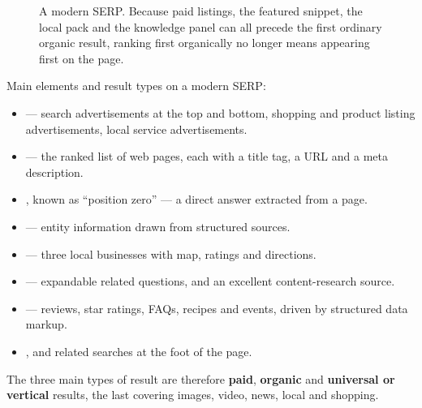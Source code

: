 \begin{figure}[htbp]
\caption[Anatomy of a modern search engine results page]%
        {A modern SERP. Because paid listings, the featured snippet, the local
         pack and the knowledge panel can all precede the first ordinary organic
         result, ranking first organically no longer means appearing first on the
         page.}
\label{fig:serp}
\end{figure}

\noindent Main elements and result types on a modern SERP:

\begin{itemize}
\item {} --- search advertisements at the top and bottom,
      shopping and product listing advertisements, local service advertisements.
\item {} --- the ranked list of web pages, each with a title
      tag, a URL and a meta description.
\item {}, known as ``position zero'' --- a direct answer
      extracted from a page.
\item {} --- entity information drawn
      from structured sources.
\item {} --- three local businesses with map, ratings
      and directions.
\item {} --- expandable related questions, and an excellent
      content-research source.
\item {} --- reviews, star ratings, FAQs, recipes and events,
      driven by structured data markup.
\item {}, and related searches at the foot of
      the page.
\end{itemize}

The three main types of result are therefore \textbf{paid}, \textbf{organic} and
\textbf{universal or vertical} results, the last covering images, video, news,
local and shopping.

